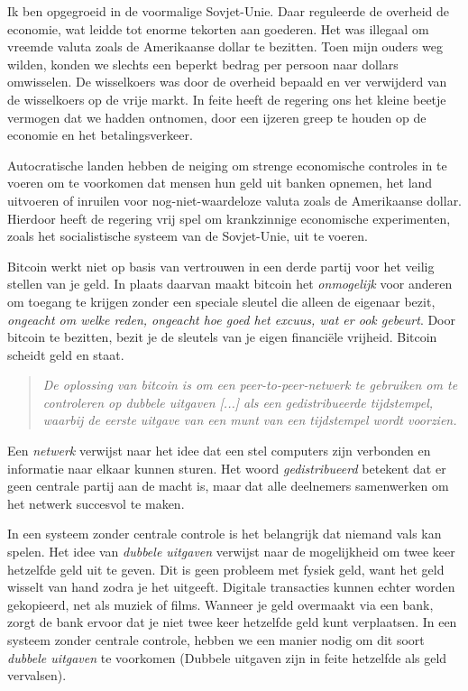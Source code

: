 Ik ben opgegroeid in de voormalige Sovjet-Unie. Daar reguleerde de overheid de economie, wat leidde tot enorme tekorten aan goederen. Het was illegaal om vreemde valuta zoals de Amerikaanse dollar te bezitten. Toen mijn ouders weg wilden, konden we slechts een beperkt bedrag per persoon naar dollars omwisselen. De wisselkoers was door de overheid bepaald en ver verwijderd van de wisselkoers op de vrije markt. In feite heeft de regering ons het kleine beetje vermogen dat we hadden ontnomen, door een ijzeren greep te houden op de economie en het betalingsverkeer.

Autocratische landen hebben de neiging om strenge economische controles in te voeren om te voorkomen dat mensen hun geld uit banken opnemen, het land uitvoeren of inruilen voor nog-niet-waardeloze valuta zoals de Amerikaanse dollar. Hierdoor heeft de regering vrij spel om krankzinnige economische experimenten, zoals het socialistische systeem van de Sovjet-Unie, uit te voeren.

Bitcoin werkt niet op basis van vertrouwen in een derde partij voor het veilig stellen van je geld. In plaats daarvan maakt bitcoin het \textit{onmogelijk} voor anderen om toegang te krijgen zonder een speciale sleutel die alleen de eigenaar bezit, \textit{ongeacht om welke reden, ongeacht hoe goed het excuus, wat er ook gebeurt}. Door bitcoin te bezitten, bezit je de sleutels van je eigen financiële vrijheid. Bitcoin scheidt geld en staat.

\begin{quote}
\textit{De oplossing van bitcoin is om een peer-to-peer-netwerk te gebruiken om te controleren op dubbele uitgaven [...] als een gedistribueerde tijdstempel, waarbij de eerste uitgave van een munt van een tijdstempel wordt voorzien.}
\end{quote}

Een \textit{netwerk} verwijst naar het idee dat een stel computers zijn verbonden en informatie naar elkaar kunnen sturen. Het woord \textit{gedistribueerd} betekent dat er geen centrale partij aan de macht is, maar dat alle deelnemers samenwerken om het netwerk succesvol te maken.

In een systeem zonder centrale controle is het belangrijk dat niemand vals kan spelen. Het idee van \textit{dubbele uitgaven} verwijst naar de mogelijkheid om twee keer hetzelfde geld uit te geven. Dit is geen probleem met fysiek geld, want het geld wisselt van hand zodra je het uitgeeft. Digitale transacties kunnen echter worden gekopieerd, net als muziek of films. Wanneer je geld overmaakt via een bank, zorgt de bank ervoor dat je niet twee keer hetzelfde geld kunt verplaatsen. In een systeem zonder centrale controle, hebben we een manier nodig om dit soort \textit{dubbele uitgaven} te voorkomen (Dubbele uitgaven zijn in feite hetzelfde als geld vervalsen). 

